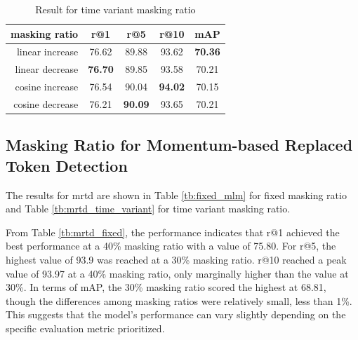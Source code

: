 \begin{table}[htbp]
  \centering
  \caption{Result for time variant masking ratio}
  \label{tb:time_variant_mlm}
  \begin{tabular}{rcccc}
    \centering
    masking ratio & r@1 & r@5 & r@10 & mAP\\ \hline
    linear increase & 76.62 & 89.88 & 93.62 & \textbf{70.36} \\
    linear decrease & \textbf{76.70} & 89.85 & 93.58 & 70.21 \\
    cosine increase & 76.54 & 90.04 & \textbf{94.02} & 70.15 \\
    cosine decrease & 76.21 & \textbf{90.09} & 93.65 & 70.21 \\
  \end{tabular}
\end{table}


\subsection{Masking Ratio for Momentum-based Replaced Token Detection}



The results for \acrshort{mrtd} are shown in Table \ref{tb:fixed_mlm} for fixed masking ratio and Table \ref{tb:mrtd_time_variant} for time variant masking ratio.

From Table \ref{tb:mrtd_fixed}, the performance indicates that r@1 achieved the best performance at a 40\% masking ratio with a value of 75.80. For r@5, the highest value of 93.9 was reached at a 30\% masking ratio. r@10 reached a peak value of 93.97 at a 40\% masking ratio, only marginally higher than the value at 30\%. In terms of mAP, the 30\% masking ratio scored the highest at 68.81, though the differences among masking ratios were relatively small, less than 1\%. This suggests that the model's performance can vary slightly depending on the specific evaluation metric prioritized.

